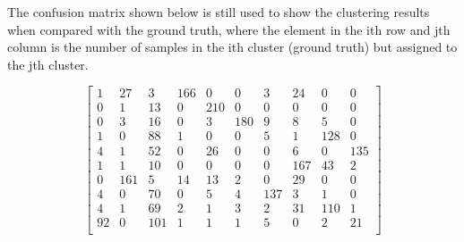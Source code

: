 \documentclass{article}
\begin{document}
The confusion matrix shown below is still used to show the clustering 
results when compared with the ground truth, where the element in the
ith row and jth column is the number of samples in the ith cluster 
(ground truth) but assigned to the jth cluster. 

\begin{equation}
\left[ \begin{array}{rrrrrrrrrr}
     1 &  27 &   3 & 166 &   0 &   0 &   3 &  24 &   0 &   0 \\
     0 &   1 &  13 &   0 & 210 &   0 &   0 &   0 &   0 &   0 \\
     0 &   3 &  16 &   0 &   3 & 180 &   9 &   8 &   5 &   0 \\
     1 &   0 &  88 &   1 &   0 &   0 &   5 &   1 & 128 &   0 \\
     4 &   1 &  52 &   0 &  26 &   0 &   0 &   6 &   0 & 135 \\
     1 &   1 &  10 &   0 &   0 &   0 &   0 & 167 &  43 &   2 \\
     0 & 161 &   5 &  14 &  13 &   2 &   0 &  29 &   0 &   0 \\
     4 &   0 &  70 &   0 &   5 &   4 & 137 &   3 &   1 &   0 \\
     4 &   1 &  69 &   2 &   1 &   3 &   2 &  31 & 110 &   1 \\
    92 &   0 & 101 &   1 &   1 &   1 &   5 &   0 &   2 &  21 \\
  \end{array}\right]
\end{equation}
\end{document}
